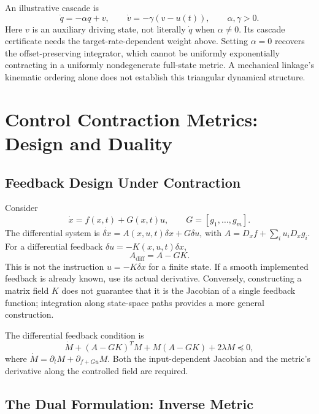 An illustrative cascade is
\begin{equation}
\dot q=-\alpha q+v,\qquad\dot v=-\gamma(v-u(t)),\qquad\alpha,\gamma>0.
\label{eq:ch4:mech-example}
\end{equation}
Here $v$ is an auxiliary driving state, not literally $\dot q$ when $\alpha\ne0$. Its cascade certificate needs the target-rate-dependent weight above. Setting $\alpha=0$ recovers the offset-preserving integrator, which cannot be uniformly exponentially contracting in a uniformly nondegenerate full-state metric. A mechanical linkage's kinematic ordering alone does not establish this triangular dynamical structure.

\section{Control Contraction Metrics: Design and Duality}
\label{sec:ch4:ccm}

\subsection{Feedback Design Under Contraction}

Consider
\begin{equation}
\dot x=f(x,t)+G(x,t)u,\qquad G=[g_1,\ldots,g_m].
\label{eq:ch4:controlled-system}
\end{equation}
The differential system is $\dot{\delta x}=A(x,u,t)\delta x+G\delta u$, with
$A=D_xf+\sum_i u_iD_xg_i$.
For a differential feedback $\delta u=-K(x,u,t)\delta x$,
\begin{equation}
A_{\mathrm{diff}}=A-GK.
\label{eq:ch4:closed-loop-jacobian}
\end{equation}
This is not the instruction $u=-K\delta x$ for a finite state. If a smooth implemented feedback is already known, use its actual derivative. Conversely, constructing a matrix field $K$ does not guarantee that it is the Jacobian of a single feedback function; integration along state-space paths provides a more general construction.

The differential feedback condition is
\begin{equation}
\dot M+(A-GK)^TM+M(A-GK)+2\lambda M\preceq0,
\label{eq:ch4:CCM-nonlinear}
\end{equation}
where $\dot M=\partial_tM+\partial_{f+Gu}M$. Both the input-dependent Jacobian and the metric's derivative along the controlled field are required.

\subsection{The Dual Formulation: Inverse Metric}

